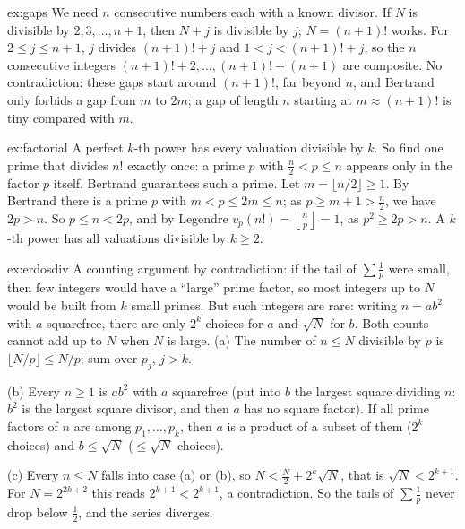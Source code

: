 \begin{solution}{ex:gaps}
\idea We need $n$ consecutive numbers each with a known divisor. If $N$ is divisible by $2,3,\dots,n+1$, then $N+j$ is divisible by $j$; $N=(n+1)!$ works.
\writeup For $2\le j\le n+1$, $j$ divides $(n+1)!+j$ and $1<j<(n+1)!+j$, so the $n$ consecutive integers $(n+1)!+2,\dots,(n+1)!+(n+1)$ are composite. No contradiction: these gaps start around $(n+1)!$, far beyond $n$, and Bertrand only forbids a gap from $m$ to $2m$; a gap of length $n$ starting at $m\approx(n+1)!$ is tiny compared with $m$.
\end{solution}

\begin{solution}{ex:factorial}
\idea A perfect $k$-th power has every valuation divisible by $k$. So find one prime that divides $n!$ exactly once: a prime $p$ with $\frac n2<p\le n$ appears only in the factor $p$ itself. Bertrand guarantees such a prime.
\writeup Let $m=\lfloor n/2\rfloor\ge1$. By Bertrand there is a prime $p$ with $m<p\le2m\le n$; as $p\ge m+1>\frac n2$, we have $2p>n$. So $p\le n<2p$, and by Legendre $v_p(n!)=\left\lfloor\frac np\right\rfloor=1$, as $p^2\ge2p>n$. A $k$-th power has all valuations divisible by $k\ge2$.
\end{solution}

\begin{solution}{ex:erdosdiv}
\idea A counting argument by contradiction: if the tail of $\sum\frac1p$ were small, then few integers would have a ``large'' prime factor, so most integers up to $N$ would be built from $k$ small primes. But such integers are rare: writing $n=ab^2$ with $a$ squarefree, there are only $2^k$ choices for $a$ and $\sqrt N$ for $b$. Both counts cannot add up to $N$ when $N$ is large.
\writeup (a) The number of $n\le N$ divisible by $p$ is $\lfloor N/p\rfloor\le N/p$; sum over $p_j$, $j>k$.

(b) Every $n\ge1$ is $ab^2$ with $a$ squarefree (put into $b$ the largest square dividing $n$: $b^2$ is the largest square divisor, and then $a$ has no square factor). If all prime factors of $n$ are among $p_1,\dots,p_k$, then $a$ is a product of a subset of them ($2^k$ choices) and $b\le\sqrt N$ ($\le\sqrt N$ choices).

(c) Every $n\le N$ falls into case (a) or (b), so $N<\frac N2+2^k\sqrt N$, that is $\sqrt N<2^{k+1}$. For $N=2^{2k+2}$ this reads $2^{k+1}<2^{k+1}$, a contradiction. So the tails of $\sum\frac1p$ never drop below $\frac12$, and the series diverges.
\end{solution}

